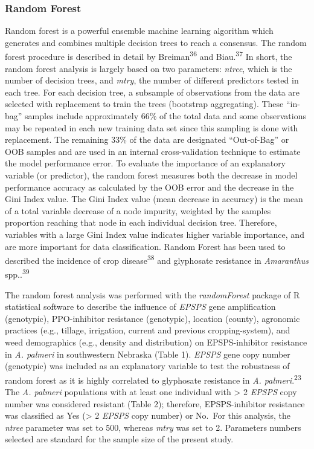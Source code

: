\documentclass[
  12pt,
  a4paper]{article}
\begin{document}
\hypertarget{random-forest}{%
\subsubsection{Random Forest}\label{random-forest}}

Random forest is a powerful ensemble machine learning algorithm which
generates and combines multiple decision trees to reach a consensus. The
random forest procedure is described in detail by
Breiman\textsuperscript{36} and Biau.\textsuperscript{37} In short, the
random forest analysis is largely based on two parameters: \emph{ntree},
which is the number of decision trees, and \emph{mtry}, the number of
different predictors tested in each tree. For each decision tree, a
subsample of observations from the data are selected with replacement to
train the trees (bootstrap aggregating). These ``in-bag'' samples
include approximately 66\% of the total data and some observations may
be repeated in each new training data set since this sampling is done
with replacement. The remaining 33\% of the data are designated
``Out-of-Bag'' or OOB samples and are used in an internal
cross-validation technique to estimate the model performance error. To
evaluate the importance of an explanatory variable (or predictor), the
random forest measures both the decrease in model performance accuracy
as calculated by the OOB error and the decrease in the Gini Index value.
The Gini Index value (mean decrease in accuracy) is the mean of a total
variable decrease of a node impurity, weighted by the samples proportion
reaching that node in each individual decision tree. Therefore,
variables with a large Gini Index value indicates higher variable
importance, and are more important for data classification. Random
Forest has been used to described the incidence of crop
disease\textsuperscript{38} and glyphosate resistance in
\emph{Amaranthus} spp..\textsuperscript{39}

The random forest analysis was performed with the \emph{randomForest}
package of R statistical software to describe the influence of
\emph{EPSPS} gene amplification (genotypic), PPO-inhibitor resistance
(genotypic), location (county), agronomic practices (e.g., tillage,
irrigation, current and previous cropping-system), and weed demographics
(e.g., density and distribution) on EPSPS-inhibitor resistance in
\emph{A. palmeri} in southwestern Nebraska (Table 1). \emph{EPSPS} gene
copy number (genotypic) was included as an explanatory variable to test
the robustness of random forest as it is highly correlated to glyphosate
resistance in \emph{A. palmeri}.\textsuperscript{23} The \emph{A.
palmeri} populations with at least one individual with \textgreater{} 2
\emph{EPSPS} copy number was considered resistant (Table 2); therefore,
EPSPS-inhibitor resistance was classified as Yes (\textgreater{} 2
\emph{EPSPS} copy number) or No.~For this analysis, the \emph{ntree}
parameter was set to 500, whereas \emph{mtry} was set to 2. Parameters
numbers selected are standard for the sample size of the present study.
\end{document}
